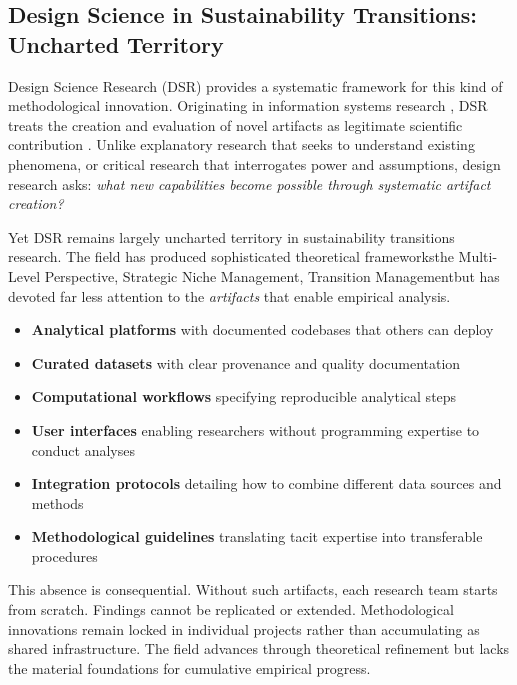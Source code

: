 \documentclass[../main.tex]{subfiles}
\begin{document}
\subsection{Design Science in Sustainability Transitions: Uncharted Territory}

Design Science Research (DSR) provides a systematic framework for this kind of methodological innovation.  Originating in information systems research \cite{march1995design}, DSR treats the creation and evaluation of novel artifacts as legitimate scientific contribution \cite{peffers2007dsr}. Unlike explanatory research that seeks to understand existing phenomena, or critical research that interrogates power and assumptions, design research asks: \emph{what new capabilities become possible through systematic artifact creation?}

Yet DSR remains largely uncharted territory in sustainability transitions research. The field has produced sophisticated theoretical frameworks\textemdash the Multi-Level Perspective, Strategic Niche Management, Transition Management\textemdash but has devoted far less attention to the \emph{artifacts} that enable empirical analysis.

\begin{itemize}[leftmargin=*, itemsep=0.3em]
\item \textbf{Analytical platforms} with documented codebases that others can deploy
\item \textbf{Curated datasets} with clear provenance and quality documentation
\item \textbf{Computational workflows} specifying reproducible analytical steps
\item \textbf{User interfaces} enabling researchers without programming expertise to conduct analyses
\item \textbf{Integration protocols} detailing how to combine different data sources and methods
\item \textbf{Methodological guidelines} translating tacit expertise into transferable procedures
\end{itemize}

This absence is consequential. Without such artifacts, each research team starts from scratch. Findings cannot be replicated or extended. Methodological innovations remain locked in individual projects rather than accumulating as shared infrastructure. The field advances through theoretical refinement but lacks the material foundations for cumulative empirical progress.
\end{document}
